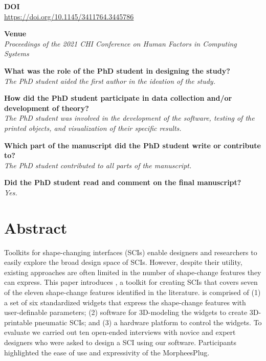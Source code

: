  \bigskip

  \noindent
  \textbf{DOI}\\
  \href{https://doi.org/10.1145/3411764.3445786}{https://doi.org/10.1145/3411764.3445786}

  \bigskip

  \noindent
  \textbf{Venue}\\
  \textit{Proceedings of the 2021 CHI Conference on Human Factors in Computing Systems}


  \bigskip

  \noindent
	\textbf{What was the role of the PhD student in designing the study?}\\
  \textit{The PhD student aided the first author in the ideation of the study.}

	\bigskip

	\noindent
	\textbf{How did the PhD student participate in data collection and/or development of theory?}\\
  \textit{The PhD student was involved in the development of the software,
    testing of the printed objects, and visualization of their specific results.}

	\bigskip

	\noindent
	\textbf{Which part of the manuscript did the PhD student write or contribute to?}\\
  \textit{The PhD student contributed to all parts of the manuscript.}

	\bigskip

	\noindent
	\textbf{Did the PhD student read and comment on the final manuscript?}\\
	\textit{Yes.}

  \bigskip
  \vfill

  \newpage

  \section{Abstract}
    Toolkits for shape-changing interfaces (SCIs) enable designers and researchers
    to easily explore the broad design space of SCIs. However, despite their
    utility, existing approaches are often limited in the number of shape-change
    features they can express. This paper introduces \mp, a toolkit for creating
    SCIs that covers seven of the eleven shape-change features identified in the
    literature. \mp is comprised of (1) a set of six standardized widgets that
    express the shape-change features with user-definable parameters; (2) software
    for 3D-modeling the widgets to create 3D-printable pneumatic SCIs; and (3) a
    hardware platform to control the widgets. To evaluate \mp we carried out ten
    open-ended interviews with novice and expert designers who were asked to
    design a SCI using our software. Participants highlighted the ease of use and
    expressivity of the MorpheesPlug.

